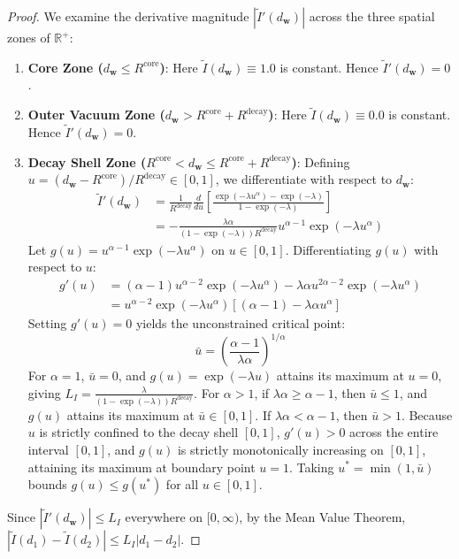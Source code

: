 \documentclass[times, review, 10pt]{elsarticle}
\begin{document}
\begin{proof}
We examine the derivative magnitude $|\tilde{I}'(d_{\mathbf{w}})|$ across the three spatial zones of $\mathbb{R}^+$:
\begin{enumerate}
    \item \textbf{Core Zone ($d_{\mathbf{w}} \le R^{\mathrm{core}}$)}: Here $\tilde{I}(d_{\mathbf{w}}) \equiv 1.0$ is constant. Hence $\tilde{I}'(d_{\mathbf{w}}) = 0$.
    \item \textbf{Outer Vacuum Zone ($d_{\mathbf{w}} > R^{\mathrm{core}} + R^{\mathrm{decay}}$)}: Here $\tilde{I}(d_{\mathbf{w}}) \equiv 0.0$ is constant. Hence $\tilde{I}'(d_{\mathbf{w}}) = 0$.
    \item \textbf{Decay Shell Zone ($R^{\mathrm{core}} < d_{\mathbf{w}} \le R^{\mathrm{core}} + R^{\mathrm{decay}}$)}: Defining $u = (d_{\mathbf{w}} - R^{\mathrm{core}}) / R^{\mathrm{decay}} \in [0, 1]$, we differentiate with respect to $d_{\mathbf{w}}$:
    \begin{align}
    \tilde{I}'(d_{\mathbf{w}}) &= \frac{1}{R^{\mathrm{decay}}} \frac{d}{du}\left[ \frac{\exp(-\lambda u^\alpha) - \exp(-\lambda)}{1 - \exp(-\lambda)} \right] \\
    &= -\frac{\lambda \alpha}{(1 - \exp(-\lambda)) R^{\mathrm{decay}}} u^{\alpha-1} \exp(-\lambda u^\alpha)
    \end{align}
    Let $g(u) = u^{\alpha-1} \exp(-\lambda u^\alpha)$ on $u \in [0, 1]$. Differentiating $g(u)$ with respect to $u$:
    \begin{align}
    g'(u) &= (\alpha - 1) u^{\alpha-2} \exp(-\lambda u^\alpha) - \lambda \alpha u^{2\alpha-2} \exp(-\lambda u^\alpha) \\
    &= u^{\alpha-2} \exp(-\lambda u^\alpha) \left[ (\alpha - 1) - \lambda \alpha u^\alpha \right]
    \end{align}
    Setting $g'(u) = 0$ yields the unconstrained critical point:
    \begin{equation}
    \bar{u} = \left(\frac{\alpha - 1}{\lambda \alpha}\right)^{1/\alpha}
    \end{equation}
    For $\alpha = 1$, $\bar{u} = 0$, and $g(u) = \exp(-\lambda u)$ attains its maximum at $u=0$, giving $L_I = \frac{\lambda}{(1 - \exp(-\lambda)) R^{\mathrm{decay}}}$.
    For $\alpha > 1$, if $\lambda \alpha \ge \alpha - 1$, then $\bar{u} \le 1$, and $g(u)$ attains its maximum at $\bar{u} \in [0, 1]$.
    If $\lambda \alpha < \alpha - 1$, then $\bar{u} > 1$. Because $u$ is strictly confined to the decay shell $[0, 1]$, $g'(u) > 0$ across the entire interval $[0, 1]$, and $g(u)$ is strictly monotonically increasing on $[0, 1]$, attaining its maximum at boundary point $u = 1$.
    Taking $u^* = \min(1, \bar{u})$ bounds $g(u) \le g(u^*)$ for all $u \in [0, 1]$.
\end{enumerate}
Since $|\tilde{I}'(d_{\mathbf{w}})| \le L_I$ everywhere on $[0, \infty)$, by the Mean Value Theorem, $|\tilde{I}(d_1) - \tilde{I}(d_2)| \le L_I |d_1 - d_2|$.
\end{proof}
\end{document}
